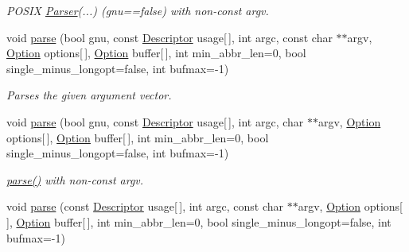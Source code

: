 \begin{DoxyCompactItemize}
\begin{DoxyCompactList}\small\item\em P\-O\-S\-I\-X \hyperlink{classxmem_1_1config_1_1third__party_1_1_parser}{Parser}(...) (gnu==false) with non-\/const argv. \end{DoxyCompactList}\item 
void \hyperlink{classxmem_1_1config_1_1third__party_1_1_parser_a0e45d97675bc5d003ef6f68ac8cd7249}{parse} (bool gnu, const \hyperlink{structxmem_1_1config_1_1third__party_1_1_descriptor}{Descriptor} usage\mbox{[}$\,$\mbox{]}, int argc, const char $\ast$$\ast$argv, \hyperlink{classxmem_1_1config_1_1third__party_1_1_option}{Option} options\mbox{[}$\,$\mbox{]}, \hyperlink{classxmem_1_1config_1_1third__party_1_1_option}{Option} buffer\mbox{[}$\,$\mbox{]}, int min\-\_\-abbr\-\_\-len=0, bool single\-\_\-minus\-\_\-longopt=false, int bufmax=-\/1)
\begin{DoxyCompactList}\small\item\em Parses the given argument vector. \end{DoxyCompactList}\item 
\hypertarget{classxmem_1_1config_1_1third__party_1_1_parser_ad6c978eb7ad107aa82dacab6980db8fa}{void \hyperlink{classxmem_1_1config_1_1third__party_1_1_parser_ad6c978eb7ad107aa82dacab6980db8fa}{parse} (bool gnu, const \hyperlink{structxmem_1_1config_1_1third__party_1_1_descriptor}{Descriptor} usage\mbox{[}$\,$\mbox{]}, int argc, char $\ast$$\ast$argv, \hyperlink{classxmem_1_1config_1_1third__party_1_1_option}{Option} options\mbox{[}$\,$\mbox{]}, \hyperlink{classxmem_1_1config_1_1third__party_1_1_option}{Option} buffer\mbox{[}$\,$\mbox{]}, int min\-\_\-abbr\-\_\-len=0, bool single\-\_\-minus\-\_\-longopt=false, int bufmax=-\/1)}\label{classxmem_1_1config_1_1third__party_1_1_parser_ad6c978eb7ad107aa82dacab6980db8fa}

\begin{DoxyCompactList}\small\item\em \hyperlink{classxmem_1_1config_1_1third__party_1_1_parser_a0e45d97675bc5d003ef6f68ac8cd7249}{parse()} with non-\/const argv. \end{DoxyCompactList}\item 
\hypertarget{classxmem_1_1config_1_1third__party_1_1_parser_aa80a5778fe3253dbfeae99ac47b20e5d}{void \hyperlink{classxmem_1_1config_1_1third__party_1_1_parser_aa80a5778fe3253dbfeae99ac47b20e5d}{parse} (const \hyperlink{structxmem_1_1config_1_1third__party_1_1_descriptor}{Descriptor} usage\mbox{[}$\,$\mbox{]}, int argc, const char $\ast$$\ast$argv, \hyperlink{classxmem_1_1config_1_1third__party_1_1_option}{Option} options\mbox{[}$\,$\mbox{]}, \hyperlink{classxmem_1_1config_1_1third__party_1_1_option}{Option} buffer\mbox{[}$\,$\mbox{]}, int min\-\_\-abbr\-\_\-len=0, bool single\-\_\-minus\-\_\-longopt=false, int bufmax=-\/1)}\label{classxmem_1_1config_1_1third__party_1_1_parser_aa80a5778fe3253dbfeae99ac47b20e5d}


\end{DoxyCompactItemize}
